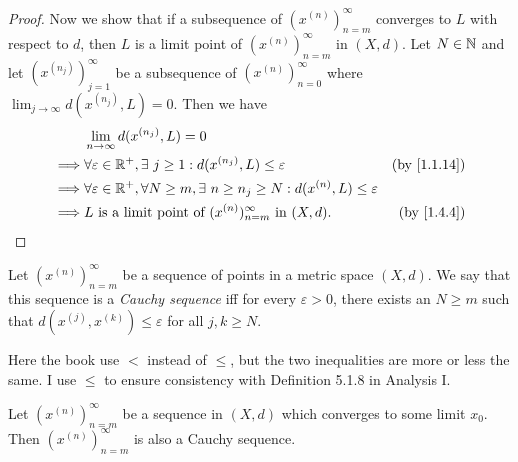 \begin{proof}
  Now we show that if a subsequence of \((x^{(n)})_{n = m}^\infty\) converges to \(L\) with respect to \(d\), then \(L\) is a limit point of \((x^{(n)})_{n = m}^\infty\) in \((X, d)\).
  Let \(N \in \mathbb{N}\) and let \((x^{(n_j)})_{j = 1}^\infty\) be a subsequence of \((x^{(n)})_{n = 0}^\infty\) where \(\lim_{j \to \infty} d(x^{(n_j)}, L) = 0\).
  Then we have
  \begin{align*}
             & \lim_{n \to \infty} d(x^{(n_j)}, L) = 0                                                                                                  \\
    \implies & \forall \varepsilon \in \R^+, \exists\ j \geq 1 : d(x^{(n_j)}, L) \leq \varepsilon                           & \text{(by \cref{1.1.14})} \\
    \implies & \forall \varepsilon \in \R^+,  \forall N \geq m, \exists\ n \geq n_j \geq N : d(x^{(n)}, L) \leq \varepsilon                             \\
    \implies & L \text{ is a limit point of } (x^{(n)})_{n = m}^\infty \text{ in } (X, d).                                  & \text{(by \cref{1.4.4})}
  \end{align*}
\end{proof}

\begin{defn}\label{1.4.6}
  Let \((x^{(n)})_{n = m}^\infty\) be a sequence of points in a metric space \((X, d)\).
  We say that this sequence is a \emph{Cauchy sequence} iff for every \(\varepsilon > 0\), there exists an \(N \geq m\) such that \(d(x^{(j)}, x^{(k)}) \leq \varepsilon\) for all \(j, k \geq N\).
\end{defn}

\begin{note}
  Here the book use \(<\) instead of \(\leq\), but the two inequalities are more or less the same.
  I use \(\leq\) to ensure consistency with Definition 5.1.8 in Analysis I.
\end{note}

\begin{lem}\label{1.4.7}
  Let \((x^{(n)})_{n = m}^\infty\) be a sequence in \((X, d)\) which converges to some limit \(x_0\).
  Then \((x^{(n)})_{n = m}^\infty\) is also a Cauchy sequence.
\end{lem}


